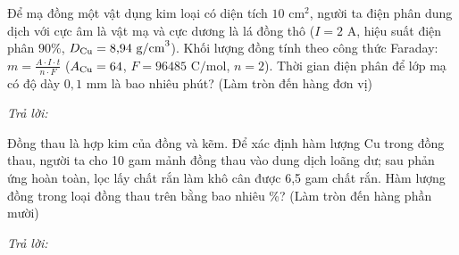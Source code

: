 \documentclass[11pt,a4paper]{article}
\def\loigiai#1{}
\begin{document}
\begin{ex}
Để mạ đồng một vật dụng kim loại có diện tích $10\text{ cm}^2$, người ta điện phân dung dịch  với cực âm là vật mạ và cực dương là lá đồng thô ($I = 2\text{ A}$, hiệu suất điện phân $90\%$, $D_{\ce{Cu}} = 8{,}94\text{ g/cm}^3$). Khối lượng đồng tính theo công thức Faraday: $m = \frac{A \cdot I \cdot t}{n \cdot F}$ ($A_{\ce{Cu}} = 64$, $F = 96485\text{ C/mol}$, $n = 2$). Thời gian điện phân để lớp mạ có độ dày $0{,}1\text{ mm}$ là bao nhiêu phút? (Làm tròn đến hàng đơn vị)
\par\noindent\textit{Trả lời:} \dotfill
\loigiai{}
\end{ex}

\begin{ex}
Đồng thau là hợp kim của đồng và kẽm. Để xác định hàm lượng Cu trong đồng thau, người ta cho 10 gam mảnh đồng thau vào dung dịch  loãng dư; sau phản ứng hoàn toàn, lọc lấy chất rắn làm khô cân được 6,5 gam chất rắn. Hàm lượng đồng trong loại đồng thau trên bằng bao nhiêu \%? (Làm tròn đến hàng phần mười)
\par\noindent\textit{Trả lời:} \dotfill
\loigiai{}
\end{ex}


\end{document}
